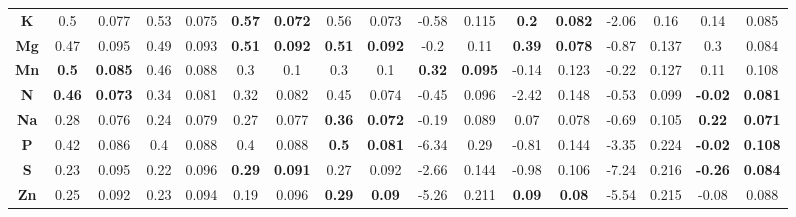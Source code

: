 \documentclass[conference]{IEEEtran}
\begin{document}
\begin{table}[htbp]
\begin{center}
\begin{tabular}{|c|c|c|c|c|c|c|c|c||c|c|c|c|c|c|c|c|}
\textbf{K} & 0.5 & 0.077 & 0.53 & 0.075 & {\color{blue}\textbf{0.57}}& {\color{blue}\textbf{0.072}}& 0.56 & 0.073 & -0.58 & 0.115 & {\color{blue}\textbf{0.2}} & {\color{blue}\textbf{0.082}} & -2.06 & 0.16 & 0.14 & 0.085 \\
\textbf{Mg} & 0.47 & 0.095 & 0.49 & 0.093 & {\color{blue}\textbf{0.51}}& {\color{blue}\textbf{0.092}}& {\color{blue}\textbf{0.51}}& {\color{blue}\textbf{0.092}} & -0.2 & 0.11 & {\color{blue}\textbf{0.39}} & {\color{blue}\textbf{0.078}} & -0.87 & 0.137 & 0.3 & 0.084 \\
\textbf{Mn} & {\color{blue}\textbf{0.5}}& {\color{blue}\textbf{0.085}}& 0.46 & 0.088 & 0.3 & 0.1 & 0.3 & 0.1 & {\color{blue}\textbf{0.32}} & {\color{blue}\textbf{0.095}} & -0.14 & 0.123 & -0.22 & 0.127 & 0.11 & 0.108 \\
\textbf{N} & {\color{blue}\textbf{0.46}}& {\color{blue}\textbf{0.073}}& 0.34 & 0.081 & 0.32 & 0.082 & 0.45 & 0.074 & -0.45 & 0.096 & -2.42 & 0.148 & -0.53 & 0.099 & {\color{blue}\textbf{-0.02}} & {\color{blue}\textbf{0.081}} \\
\textbf{Na} & 0.28 & 0.076 & 0.24 & 0.079 & 0.27 & 0.077 & {\color{blue}\textbf{0.36}}& {\color{blue}\textbf{0.072}} & -0.19 & 0.089 & 0.07 & 0.078 & -0.69 & 0.105 & {\color{blue}\textbf{0.22}} & {\color{blue}\textbf{0.071}} \\
\textbf{P} & 0.42 & 0.086 & 0.4 & 0.088 & 0.4 & 0.088 & {\color{blue}\textbf{0.5}}& {\color{blue}\textbf{0.081}} & -6.34 & 0.29 & -0.81 & 0.144 & -3.35 & 0.224 & {\color{blue}\textbf{-0.02}} & {\color{blue}\textbf{0.108}} \\
\textbf{S} & 0.23 & 0.095 & 0.22 & 0.096 & {\color{blue}\textbf{0.29}}& {\color{blue}\textbf{0.091}}& 0.27 & 0.092 & -2.66 & 0.144 & -0.98 & 0.106 & -7.24 & 0.216 & {\color{blue}\textbf{-0.26}} & {\color{blue}\textbf{0.084}} \\
\textbf{Zn} & 0.25 & 0.092 & 0.23 & 0.094 & 0.19 & 0.096 & {\color{blue}\textbf{0.29}}& {\color{blue}\textbf{0.09}} & -5.26 & 0.211 & {\color{blue}\textbf{0.09}} & {\color{blue}\textbf{0.08}} & -5.54 & 0.215 & -0.08 & 0.088 \\

\hline

\end{tabular}
\label{tab:testresults}
\end{center}
\end{table}
\end{document}
